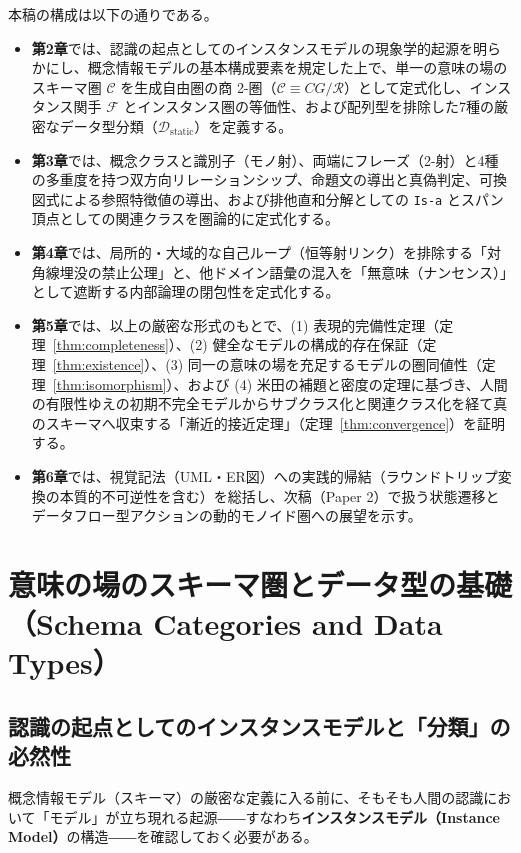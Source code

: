 \documentclass[11pt,a4paper]{ltjsarticle}
\theoremstyle{definition}
\theoremstyle{plain}
\theoremstyle{remark}
\newcommand{\Dstatic}{\mathcal{D}_{\mathrm{static}}}
\begin{document}
本稿の構成は以下の通りである。
\begin{itemize}
    \item \textbf{第2章}では、認識の起点としてのインスタンスモデルの現象学的起源を明らかにし、概念情報モデルの基本構成要素を規定した上で、単一の意味の場のスキーマ圏 $\mathcal{C}$ を生成自由圏の商 2-圏（$\mathcal{C} \equiv CG/\mathcal{R}$）として定式化し、インスタンス関手 $\mathcal{F}$ とインスタンス圏の等価性、および配列型を排除した7種の厳密なデータ型分類（$\Dstatic$）を定義する。
    \item \textbf{第3章}では、概念クラスと識別子（モノ射）、両端にフレーズ（2-射）と4種の多重度を持つ双方向リレーションシップ、命題文の導出と真偽判定、可換図式による参照特徴値の導出、および排他直和分解としての \texttt{Is-a} とスパン頂点としての関連クラスを圏論的に定式化する。
    \item \textbf{第4章}では、局所的・大域的な自己ループ（恒等射リンク）を排除する「対角線埋没の禁止公理」と、他ドメイン語彙の混入を「無意味（ナンセンス）」として遮断する内部論理の閉包性を定式化する。
    \item \textbf{第5章}では、以上の厳密な形式のもとで、(1) 表現的完備性定理（定理~\ref{thm:completeness}）、(2) 健全なモデルの構成的存在保証（定理~\ref{thm:existence}）、(3) 同一の意味の場を充足するモデルの圏同値性（定理~\ref{thm:isomorphism}）、および (4) 米田の補題と密度の定理に基づき、人間の有限性ゆえの初期不完全モデルからサブクラス化と関連クラス化を経て真のスキーマへ収束する「漸近的接近定理」（定理~\ref{thm:convergence}）を証明する。
    \item \textbf{第6章}では、視覚記法（UML・ER図）への実践的帰結（ラウンドトリップ変換の本質的不可逆性を含む）を総括し、次稿（Paper 2）で扱う状態遷移とデータフロー型アクションの動的モノイド圏への展望を示す。
\end{itemize}
\section{意味の場のスキーマ圏とデータ型の基礎（Schema Categories and Data Types）}

\subsection{認識の起点としてのインスタンスモデルと「分類」の必然性}
概念情報モデル（スキーマ）の厳密な定義に入る前に、そもそも人間の認識において「モデル」が立ち現れる起源――すなわち\textbf{インスタンスモデル（Instance Model）}の構造――を確認しておく必要がある。
\end{document}
